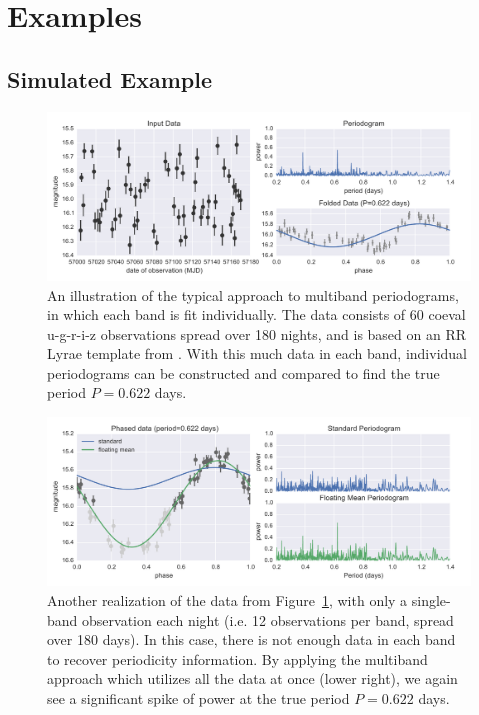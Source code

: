 \documentclass[12pt,preprint]{aastex}
\newcommand{\Fig}[1]{Figure~\ref{fig:#1}}
\newcommand{\fig}[1]{\Fig{#1}}
\begin{document}
\section{Examples}
\subsection{Simulated Example}

\begin{figure}
  \centering
  \includegraphics[width=\textwidth]{fig01.pdf}
  \caption{
    An illustration of the typical approach to multiband periodograms,
    in which each band is fit individually. The data consists of 60 coeval
    u-g-r-i-z observations spread over 180 nights, and is based on an
    RR Lyrae template from \citet{Sesar2010}. With this much data in each
    band, individual periodograms can be constructed and compared to find the
    true period $P=0.622$ days.
  }
  \label{fig:01}
\end{figure}

\begin{figure}
  \centering
  \includegraphics[width=\textwidth]{fig02.pdf}
  \caption{
    Another realization of the data from \fig{01}, with only a single-band
    observation each night (i.e. 12 observations per band, spread over 180
    days). In this case, there is not enough data in each band to recover
    periodicity information. By applying the multiband approach which utilizes
    all the data at once (lower right), we again see a significant spike of
    power at the true period $P=0.622$ days.    
  } 
  \label{fig:02}
\end{figure}
\end{document}
